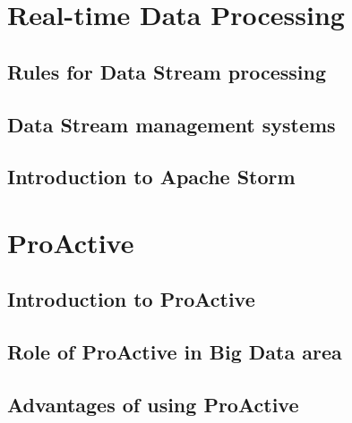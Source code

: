 \documentclass[	DIV=calc,%
							paper=a4,%
							fontsize=11pt,%
							twocolumn]{scrartcl}	 					%
\begin{document}
\section*{\color{DarkOrange} Real-time Data Processing}




\subsection*{Rules for Data Stream processing}

\subsection*{Data Stream management systems}

\subsection*{Introduction to Apache Storm}

\section*{\color{DarkOrange} ProActive}

\subsection*{Introduction to ProActive}

\subsection*{Role of ProActive in Big Data area}

\subsection*{Advantages of using ProActive}



\end{document}
